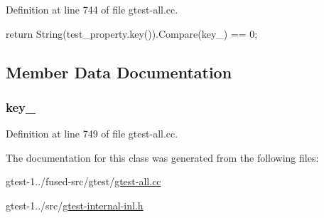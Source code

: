\-Definition at line 744 of file gtest-\/all.\-cc.


\begin{DoxyCode}
                                                           {
    return String(test_property.key()).Compare(key_) == 0;
  }
\end{DoxyCode}


\subsection{\-Member \-Data \-Documentation}
\hypertarget{classtesting_1_1internal_1_1TestPropertyKeyIs_afdc9c0d8472fabfa4466b1a0eb0d0ff2}{
\subsubsection[{key\-\_\-}]{ {\bf key\-\_\-}}}\label{d1/d6f/classtesting_1_1internal_1_1TestPropertyKeyIs_afdc9c0d8472fabfa4466b1a0eb0d0ff2}


\-Definition at line 749 of file gtest-\/all.\-cc.



\-The documentation for this class was generated from the following files\-:\begin{DoxyCompactItemize}
\item 
gtest-\/1../fused-\/src/gtest/\hyperlink{fused-src_2gtest_2gtest-all_8cc}{gtest-\/all.\-cc}\item 
gtest-\/1../src/\hyperlink{gtest-internal-inl_8h}{gtest-\/internal-\/inl.\-h}\end{DoxyCompactItemize}
